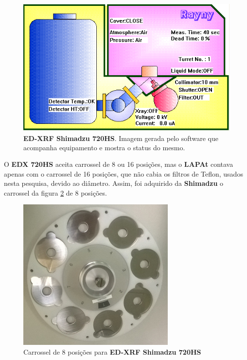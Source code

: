 \begin{figure}[H]
\begin{center}
  \includegraphics[scale=0.4]{../inputs/images/edx_iag_monitor.png}
  \caption{\textbf{ED-XRF Shimadzu 720HS}. Imagem gerada pelo software que 
           acompanha equipamento e mostra o status do mesmo. \label{fig:xrfed_software}}
\end{center}
\end{figure}

O \textbf{EDX 720HS} aceita carrossel de 8 ou 16 posições, mas o \textbf{LAPAt}
contava apenas com o carrossel de 16 posições, que não cabia os filtros de Teflon, 
usados nesta pesquisa, devido ao diâmetro. Assim, foi adquirido da \textbf{Shimadzu} 
o carrossel da figura \ref{fig:carrossel8} de 8 posições.

\begin{figure}[H]
\begin{center}
  \includegraphics[width=0.7\textwidth]{../inputs/images/carrossel8.jpg}
  \caption{Carrossel de 8 posições para \textbf{ED-XRF Shimadzu 720HS} \label{fig:carrossel8}}
\end{center}
\end{figure}

